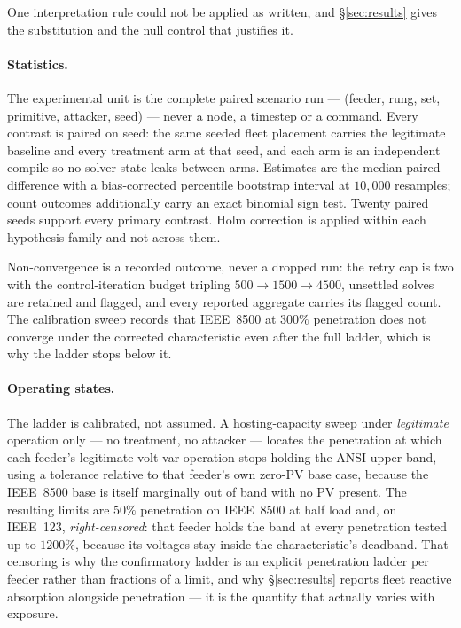 One interpretation rule could not be applied as written, and \S\ref{sec:results} gives the
substitution and the null control that justifies it.

\paragraph{Statistics.}
The experimental unit is the complete paired scenario run --- (feeder, rung, set, primitive,
attacker, seed) --- never a node, a timestep or a command. Every contrast is paired on seed: the
same seeded fleet placement carries the legitimate baseline and every treatment arm at that seed,
and each arm is an independent compile so no solver state leaks between arms. Estimates are the
median paired difference with a bias-corrected percentile bootstrap interval at $10{,}000$
resamples; count outcomes additionally carry an exact binomial sign test. Twenty paired seeds
support every primary contrast. Holm correction is applied within each hypothesis family and not
across them.

Non-convergence is a recorded outcome, never a dropped run: the retry cap is two with the
control-iteration budget tripling $500 \to 1500 \to 4500$, unsettled solves are retained and
flagged, and every reported aggregate carries its flagged count. The calibration sweep records
that IEEE~8500 at $300\%$ penetration does not converge under the corrected characteristic even
after the full ladder, which is why the ladder stops below it.

\paragraph{Operating states.}
The ladder is calibrated, not assumed. A hosting-capacity sweep under \emph{legitimate} operation
only --- no treatment, no attacker --- locates the penetration at which each feeder's legitimate
volt-var operation stops holding the ANSI upper band, using a tolerance relative to that feeder's
own zero-PV base case, because the IEEE~8500 base is itself marginally out of band with no PV
present. The resulting limits are $50\%$ penetration on IEEE~8500 at half load and, on IEEE~123,
\emph{right-censored}: that feeder holds the band at every penetration tested up to $1200\%$,
because its voltages stay inside the characteristic's deadband. That censoring is why the
confirmatory ladder is an explicit penetration ladder per feeder rather than fractions of a limit,
and why \S\ref{sec:results} reports fleet reactive absorption alongside penetration --- it is the
quantity that actually varies with exposure.
